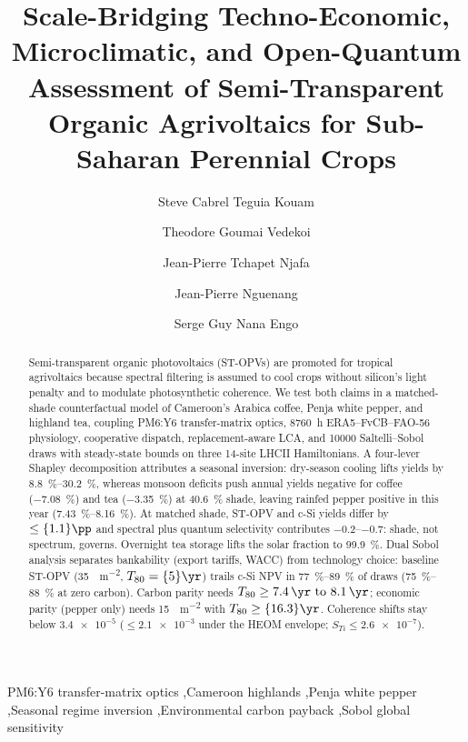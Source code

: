 \documentclass[preprint,12pt,a4paper]{elsarticle}
\begin{document}
\begin{frontmatter}

\title{Scale-Bridging Techno-Economic, Microclimatic, and Open-Quantum Assessment of Semi-Transparent Organic Agrivoltaics for Sub-Saharan Perennial Crops}

\author[udla]{Steve Cabrel Teguia Kouam}
\author[uy1]{Theodore Goumai Vedekoi}
\author[uy1]{Jean-Pierre Tchapet Njafa}
\author[udla]{Jean-Pierre Nguenang}
\author[uy1]{Serge Guy Nana Engo}

\address[udla]{Department of Physics, Faculty of Science, University of Douala, P.O. Box 24157, Douala, Cameroon}
\address[uy1]{Department of Physics, Faculty of Science, University of Yaound\'e~I, P.O. Box 812, Yaound\'e, Cameroon}

\begin{abstract}
Semi-transparent organic photovoltaics (ST-OPVs) are promoted for tropical agrivoltaics because spectral filtering is assumed to cool crops without silicon's light penalty and to modulate photosynthetic coherence. We test both claims in a matched-shade counterfactual model of Cameroon's Arabica coffee, Penja white pepper, and highland tea, coupling PM6:Y6 transfer-matrix optics, \qty{8760}{\hour} ERA5--FvCB--FAO-56 physiology, cooperative dispatch, replacement-aware LCA, and \num{10000} Saltelli--Sobol draws with steady-state bounds on three 14-site LHCII Hamiltonians. A four-lever Shapley decomposition attributes a seasonal inversion: dry-season cooling lifts yields by \qtyrange{8.8}{30.2}{\percent}, whereas monsoon deficits push annual yields negative for coffee (\qty{-7.08}{\percent}) and tea (\qty{-3.35}{\percent}) at \qty{40.6}{\percent} shade, leaving rainfed pepper positive in this year (\qtyrange{+7.43}{+8.16}{\percent}). At matched shade, ST-OPV and c-Si yields differ by $\le \qty{1.1}{\pp}$ and spectral plus quantum selectivity contributes \qtyrange{-0.2}{-0.7}{\pp}: shade, not spectrum, governs. Overnight tea storage lifts the solar fraction to \qty{99.9}{\percent}. Dual Sobol analysis separates bankability (export tariffs, WACC) from technology choice: baseline ST-OPV (\qty{35}{\USD\per\square\meter}, $T_{80}=\qty{5}{\yr}$) trails c-Si NPV in \qtyrange{77}{89}{\percent} of draws (\qtyrange{75}{88}{\percent} at zero carbon). Carbon parity needs $T_{80}\ge \qtyrange{7.4}{8.1}{\yr}$; economic parity (pepper only) needs \qty{15}{\USD\per\square\meter} with $T_{80}\ge \qty{16.3}{\yr}$. Coherence shifts stay below $\num{3.4e-5}$ ($\le \num{2.1e-3}$ under the HEOM envelope; $S_{Ti}\le \num{2.6e-7}$).
\end{abstract}

\begin{keyword}
PM6:Y6 transfer-matrix optics \sep Cameroon highlands \sep Penja white pepper \sep Seasonal regime inversion \sep Environmental carbon payback \sep Sobol global sensitivity
\end{keyword}

\end{frontmatter}
\linenumbers
\end{document}
